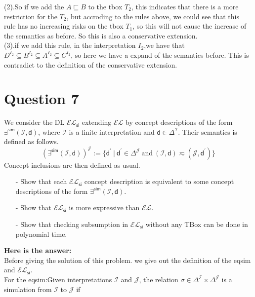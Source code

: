 \documentclass{article}
\begin{document}
    (2).So if we add the $A \sqsubseteq B$ to the tbox $T_2$, this indicates that there is a more restriction for the $T_2$, but accroding to the rules above, we could see that this rule has no increasing risks on the tbox $T_1$, so this will not cause the increase of the semantics as before. So this is also a conservative extension.\\
    
    (3).if we add this rule, in the interpretation $I_2$,we have that $D^{I_2} \subseteq B^{I_2} \subseteq A^{I_2} \subseteq C^{I_2}$, so here we have a expand of the semantics before. This is contradict to the definition of the conservative extension.\\

    \section{Question 7}
    We consider the DL $\mathcal{EL}_{\textsf{si}}$ extending $\mathcal{EL}$ by concept descriptions of the form $\exists^{\textsf{sim}}(\mathcal{I},\textsf{d})$, where $\mathcal{I}$ is a finite interpretation and $\textsf{d}\in\Delta^{\mathcal{I}}$. Their semantics is defined as follows.
    \[(\exists^{\textsf{sim}}(\mathcal{I},\textsf{d}))^{\mathcal{J}}:=\{\textsf{d}^{\prime}~|~\textsf{d}^{\prime}\in\Delta^{\mathcal{J}}~\text{and}~(\mathcal{I},\textsf{d})\eqsim(\mathcal{J},\textsf{d}^{\prime})\}\]
    Concept inclusions are then defined as usual.
    \begin{itemize}
        \item[-] Show that each $\mathcal{EL}_\textsf{si}$ concept description is equivalent to some concept descriptions of the form $\exists^{\textsf{sim}}(\mathcal{I},\textsf{d})$.
        \item[-] Show that $\mathcal{EL}_\textsf{si}$ is more expressive than $\mathcal{EL}$.
        \item[-] Show that checking subsumption in $\mathcal{EL}_\textsf{si}$ without any TBox can be done in polynomial time.
    \end{itemize}
    \textbf{Here is the answer:}\\
    Before giving the solution of this problem. we give out the definition of the eqsim and $\mathcal{EL}_{\textsf{si}}$.\\
    For the eqsim:Given interpretations $\mathcal{I}$ and $\mathcal{J}$, the relation $\sigma\in\Delta^{\mathcal{I}}\times\Delta^{\mathcal{J}}$ is a simulation from $\mathcal{I}$ to $\mathcal{J}$ if\\
\end{document}

